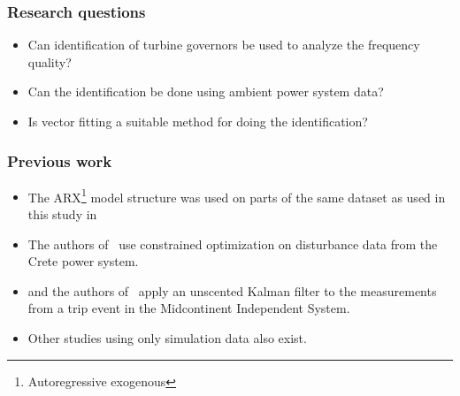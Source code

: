\begin{frame}
		\frametitle{Research questions}
		\begin{itemize}
				\item<1-> Can identification of turbine governors be used to analyze the frequency quality?
				\item<2-> Can the identification be done using ambient power system data?
				\item<3-> Is vector fitting a suitable method for doing the identification?
		\end{itemize}
\end{frame}
\begin{frame}
		\frametitle{Previous work}
		\begin{itemize}
				\item The ARX\footnote{Autoregressive exogenous} model structure was used on parts of the same dataset as used in this study in~\cite{dinh_thuc_duong_estimation_2016}
				\item The authors of~\cite{hatziargyriou_identification_2001} use constrained optimization on disturbance data from the Crete power system.
				\item and the authors of~\cite{aghamolki_identification_2015} apply an unscented Kalman filter to the measurements from a trip event in the Midcontinent Independent System.
				\item  Other studies using only simulation data also exist.
		\end{itemize}
\end{frame}

